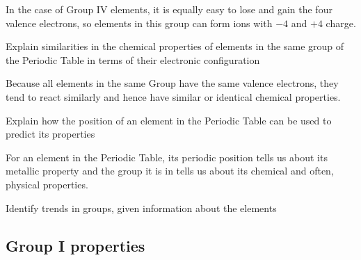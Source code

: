In the case of Group IV elements, it is equally easy to lose and gain the four valence electrons,
so elements in this group can form ions with $-4$ and $+4$ charge.

\begin{point}
Explain similarities in the chemical properties of elements in the same group of the Periodic Table in terms 
of their electronic configuration
\end{point}

Because all elements in the same Group have the same valence electrons, they tend to react
similarly and hence have similar or identical chemical properties.

\begin{point}
Explain how the position of an element in the Periodic Table can be used to predict its properties
\end{point}

For an element in the Periodic Table, its periodic position tells us about its metallic property
and the group it is in tells us about its chemical and often, physical properties.

\begin{point}
Identify trends in groups, given information about the elements
\end{point}

\subsection{Group I properties}
